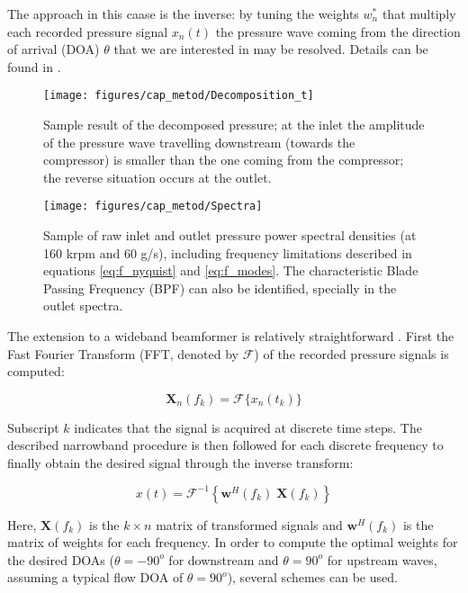 The approach in this caase is the inverse: by tuning the weights $w_n^*$ that multiply each recorded pressure signal $x_n(t)$ the pressure wave coming from the direction of arrival (DOA) $\theta$ that we are interested in may be resolved. Details can be found in \cite{van1988beamforming}.

\begin{figure}[t!]
\centering
\texttt{[image: figures/cap\_metod/Decomposition\_t]}
\caption[Sample result of decomposed pressure]{Sample result of the decomposed pressure; at the inlet the amplitude of the pressure wave travelling downstream (towards the compressor) is smaller than the one coming from the compressor; the reverse situation occurs at the outlet.}
\label{fig:decomposition}
\end{figure}

\begin{figure}[t!]
\texttt{[image: figures/cap\_metod/Spectra]}
\caption[Sample of raw inlet and outlet pressure PSD]{Sample of raw inlet and outlet pressure power spectral densities (at 160 krpm and 60 g/s), including frequency limitations described in equations \ref{eq:f_nyquist} and \ref{eq:f_modes}. The characteristic Blade Passing Frequency (BPF) can also be identified, specially in the outlet spectra.}
\label{fig:spectra}
\end{figure}

The extension to a wideband beamformer is relatively straightforward \cite{piper2011broadband}. First the Fast Fourier Transform (FFT, denoted by $\mathcal F$) of the recorded pressure signals is computed:

\begin{equation}
  \mathbf X_n(f_k)=\mathcal{F}\{x_n(t_k)\}
\end{equation}

Subscript $k$ indicates that the signal is acquired at discrete time steps. The described narrowband procedure is then followed for each discrete frequency to finally obtain the desired signal through the inverse transform:

\begin{equation}
    x(t)=\mathcal{F}^{-1}\left\{\mathbf w^H(f_k)\; \mathbf X(f_k)\right\}
\end{equation}

Here, $\mathbf X(f_k)$ is the $k \times n$ matrix of transformed signals and $\mathbf w^H(f_k)$ is the matrix of weights for each frequency. In order to compute the optimal weights for the desired DOAs ($\theta=-90^o$ for downstream and $\theta=90^o$ for upstream waves, assuming a typical flow DOA of $\theta=90^o$), several schemes can be used.

